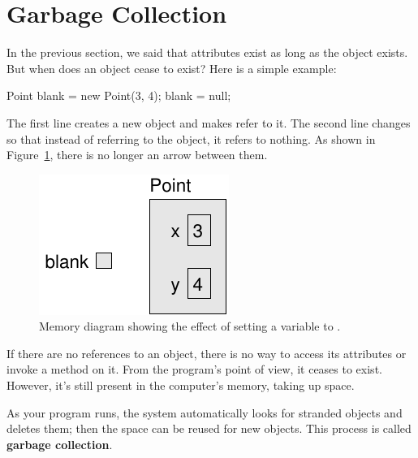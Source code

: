\section{Garbage Collection}

In the previous section, we said that attributes exist as long as the object exists.
But when does an object cease to exist?
Here is a simple example:


\begin{code}
Point blank = new Point(3, 4);
blank = null;
\end{code}

The first line creates a new  object and makes  refer to it.
The second line changes  so that instead of referring to the object, it refers to nothing.
As shown in Figure~\ref{fig.reference3}, there is no longer an arrow between them.

\begin{figure}[!ht]
\begin{center}
\includegraphics{figs/reference3.pdf}
\caption{Memory diagram showing the effect of setting a variable to .}
\label{fig.reference3}
\end{center}
\end{figure}

If there are no references to an object, there is no way to access its attributes or invoke a method on it.
From the program's point of view, it ceases to exist.
However, it's still present in the computer's memory, taking up space.


As your program runs, the system automatically looks for stranded objects and deletes them; then the space can be reused for new objects.
This process is called {\bf garbage collection}.

